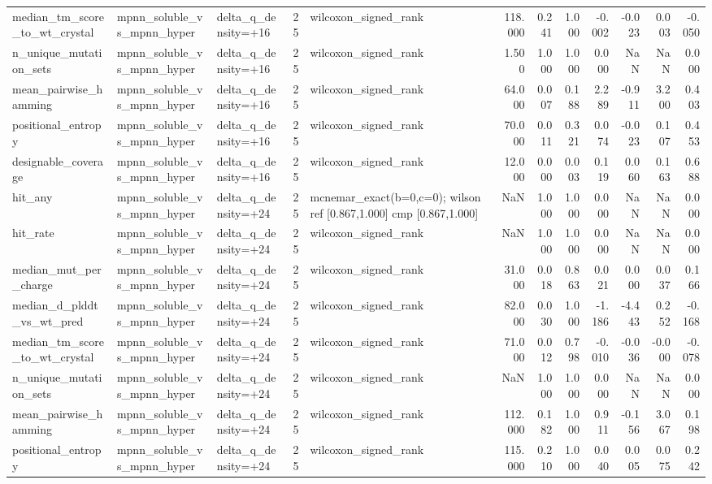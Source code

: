 \begin{table}
{\begin{tabular}{lllrlrrrrrrr}
median\_tm\_score\_to\_wt\_crystal & mpnn\_soluble\_vs\_mpnn\_hyper & delta\_q\_density=+16 & 25 & wilcoxon\_signed\_rank & 118.000 & 0.241 & 1.000 & -0.002 & -0.023 & 0.003 & -0.050 \\
n\_unique\_mutation\_sets & mpnn\_soluble\_vs\_mpnn\_hyper & delta\_q\_density=+16 & 25 & wilcoxon\_signed\_rank & 1.500 & 1.000 & 1.000 & 0.000 & NaN & NaN & 0.000 \\
mean\_pairwise\_hamming & mpnn\_soluble\_vs\_mpnn\_hyper & delta\_q\_density=+16 & 25 & wilcoxon\_signed\_rank & 64.000 & 0.007 & 0.188 & 2.289 & -0.911 & 3.200 & 0.403 \\
positional\_entropy & mpnn\_soluble\_vs\_mpnn\_hyper & delta\_q\_density=+16 & 25 & wilcoxon\_signed\_rank & 70.000 & 0.011 & 0.321 & 0.074 & -0.023 & 0.107 & 0.453 \\
designable\_coverage & mpnn\_soluble\_vs\_mpnn\_hyper & delta\_q\_density=+16 & 25 & wilcoxon\_signed\_rank & 12.000 & 0.000 & 0.003 & 0.119 & 0.060 & 0.163 & 0.688 \\
hit\_any & mpnn\_soluble\_vs\_mpnn\_hyper & delta\_q\_density=+24 & 25 & mcnemar\_exact(b=0,c=0); wilson ref [0.867,1.000] cmp [0.867,1.000] & NaN & 1.000 & 1.000 & 0.000 & NaN & NaN & 0.000 \\
hit\_rate & mpnn\_soluble\_vs\_mpnn\_hyper & delta\_q\_density=+24 & 25 & wilcoxon\_signed\_rank & NaN & 1.000 & 1.000 & 0.000 & NaN & NaN & 0.000 \\
median\_mut\_per\_charge & mpnn\_soluble\_vs\_mpnn\_hyper & delta\_q\_density=+24 & 25 & wilcoxon\_signed\_rank & 31.000 & 0.018 & 0.863 & 0.021 & 0.000 & 0.037 & 0.166 \\
median\_d\_plddt\_vs\_wt\_pred & mpnn\_soluble\_vs\_mpnn\_hyper & delta\_q\_density=+24 & 25 & wilcoxon\_signed\_rank & 82.000 & 0.030 & 1.000 & -1.186 & -4.443 & 0.252 & -0.168 \\
median\_tm\_score\_to\_wt\_crystal & mpnn\_soluble\_vs\_mpnn\_hyper & delta\_q\_density=+24 & 25 & wilcoxon\_signed\_rank & 71.000 & 0.012 & 0.798 & -0.010 & -0.036 & -0.000 & -0.078 \\
n\_unique\_mutation\_sets & mpnn\_soluble\_vs\_mpnn\_hyper & delta\_q\_density=+24 & 25 & wilcoxon\_signed\_rank & NaN & 1.000 & 1.000 & 0.000 & NaN & NaN & 0.000 \\
mean\_pairwise\_hamming & mpnn\_soluble\_vs\_mpnn\_hyper & delta\_q\_density=+24 & 25 & wilcoxon\_signed\_rank & 112.000 & 0.182 & 1.000 & 0.911 & -0.156 & 3.067 & 0.198 \\
positional\_entropy & mpnn\_soluble\_vs\_mpnn\_hyper & delta\_q\_density=+24 & 25 & wilcoxon\_signed\_rank & 115.000 & 0.210 & 1.000 & 0.040 & 0.005 & 0.075 & 0.242 \\

\end{tabular}}
\end{table}
